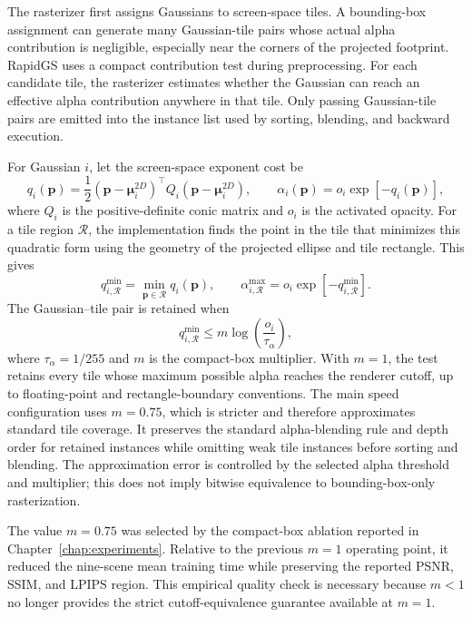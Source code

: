 The rasterizer first assigns Gaussians to screen-space tiles. A bounding-box assignment can generate many Gaussian-tile pairs whose actual alpha contribution is negligible, especially near the corners of the projected footprint. RapidGS uses a compact contribution test during preprocessing. For each candidate tile, the rasterizer estimates whether the Gaussian can reach an effective alpha contribution anywhere in that tile. Only passing Gaussian-tile pairs are emitted into the instance list used by sorting, blending, and backward execution.

For Gaussian $i$, let the screen-space exponent cost be
\begin{equation}
q_i(\mathbf{p})
=
\frac{1}{2}
(\mathbf{p}-\boldsymbol{\mu}_{i}^{2D})^\top
Q_i
(\mathbf{p}-\boldsymbol{\mu}_{i}^{2D}),
\qquad
\alpha_i(\mathbf{p})=o_i\exp[-q_i(\mathbf{p})],
\end{equation}
where $Q_i$ is the positive-definite conic matrix and $o_i$ is the activated opacity. For a tile region $\mathcal{R}$, the implementation finds the point in the tile that minimizes this quadratic form using the geometry of the projected ellipse and tile rectangle. This gives
\begin{equation}
q_{i,\mathcal{R}}^{\min}
=
\min_{\mathbf{p}\in\mathcal{R}}q_i(\mathbf{p}),
\qquad
\alpha_{i,\mathcal{R}}^{\max}
=
o_i\exp[-q_{i,\mathcal{R}}^{\min}].
\end{equation}
The Gaussian--tile pair is retained when
\begin{equation}
q_{i,\mathcal{R}}^{\min}
\le
m\log\!\left(\frac{o_i}{\tau_\alpha}\right),
\end{equation}
where $\tau_\alpha=1/255$ and $m$ is the compact-box multiplier. With $m=1$, the test retains every tile whose maximum possible alpha reaches the renderer cutoff, up to floating-point and rectangle-boundary conventions. The main speed configuration uses $m=0.75$, which is stricter and therefore approximates standard tile coverage. It preserves the standard alpha-blending rule and depth order for retained instances while omitting weak tile instances before sorting and blending. The approximation error is controlled by the selected alpha threshold and multiplier; this does not imply bitwise equivalence to bounding-box-only rasterization.

The value $m=0.75$ was selected by the compact-box ablation reported in Chapter~\ref{chap:experiments}. Relative to the previous $m=1$ operating point, it reduced the nine-scene mean training time while preserving the reported PSNR, SSIM, and LPIPS region. This empirical quality check is necessary because $m<1$ no longer provides the strict cutoff-equivalence guarantee available at $m=1$.

